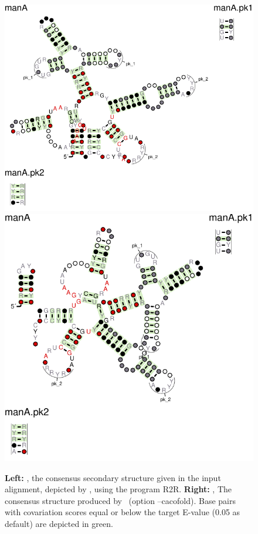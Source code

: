  \begin{figure}[h]
   \includegraphics[scale=0.7]{manA_R2R.pdf} 
  \includegraphics[scale=0.7]{manA_fold_R2R.pdf} 
  \caption{\small\textbf{Left:}
    , the consensus
    secondary structure given in the input alignment, depicted by
    \rscape, using the program R2R.  \textbf{Right:}
    , The consensus
    structure produced by \rscape\ (option --cacofold).  Base pairs with
    covariation scores equal or below the target E-value (0.05 as
    default) are depicted in green.  }
 \label{fig:manA_r2r}
 \end{figure}
 

